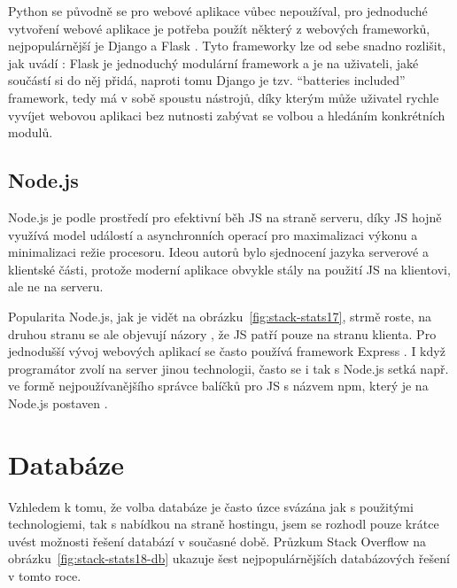         Python se původně se pro webové aplikace vůbec nepoužíval, pro jednoduché vytvoření webové aplikace je potřeba použít některý z webových frameworků, nejpopulárnější je Django a Flask \cite{tech-python4}. Tyto frameworky lze od sebe snadno rozlišit, jak uvádí \cite{tech-python5}: Flask je jednoduchý modulární framework a je na uživateli, jaké součástí si do něj přidá, naproti tomu Django je tzv. \enquote{batteries included} framework, tedy má v sobě spoustu nástrojů, díky kterým může uživatel rychle vyvíjet webovou aplikaci bez nutnosti zabývat se volbou a hledáním konkrétních modulů.
        
        \subsection{Node.js}\label{nodejs}
        Node.js je podle \cite{tech1} prostředí pro efektivní běh JS na straně serveru, díky JS hojně využívá model událostí a asynchronních operací pro maximalizaci výkonu a minimalizaci režie procesoru. Ideou autorů bylo sjednocení jazyka serverové a klientské části, protože moderní aplikace obvykle stály na použití JS na klientovi, ale ne na serveru. 
        
        Popularita Node.js, jak je vidět na obrázku~\ref{fig:stack-stats17}, strmě roste, na druhou stranu se ale objevují názory \cite{tech-node1}, že JS patří pouze na stranu klienta. Pro jednodušší vývoj webových aplikací se často používá framework Express \cite{tech-node2}. I když programátor zvolí na server jinou technologii, často se i tak s Node.js setká např. ve formě nejpoužívanějšího správce balíčků pro JS s názvem npm, který je na Node.js postaven \cite{tech1}.


    \section{Databáze}
    Vzhledem k tomu, že volba databáze je často úzce svázána jak s použitými technologiemi, tak s nabídkou na straně hostingu, jsem se rozhodl pouze krátce uvést možnosti řešení databází v současné době. Průzkum Stack Overflow \cite{stack-stats18} na obrázku~\ref{fig:stack-stats18-db} ukazuje šest nejpopulárnějších databázových řešení v tomto roce.
    
